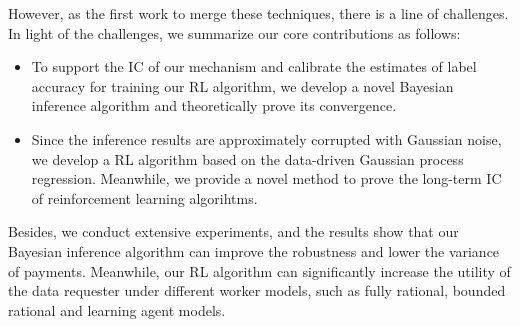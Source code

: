 However, as the first work to merge these techniques, there is a line of challenges. In light of the challenges, we summarize our core contributions as follows:
\begin{itemize}[topsep=0pt,  itemsep=0pt]
\item To support the IC of our mechanism and calibrate the estimates of label accuracy for training our RL algorithm, we develop a novel Bayesian inference algorithm and theoretically prove its convergence.
\item Since the inference results are approximately corrupted with Gaussian noise, we develop a RL algorithm based on the data-driven Gaussian process regression. Meanwhile, we provide a novel method to prove the long-term IC of reinforcement learning algorihtms.
\end{itemize}
Besides, we conduct extensive experiments, and the results show that our Bayesian inference algorithm can improve the robustness and lower the variance of payments. Meanwhile, our RL algorithm can significantly increase the utility of the data requester under different worker models, such as fully rational, bounded rational and learning agent models. 

